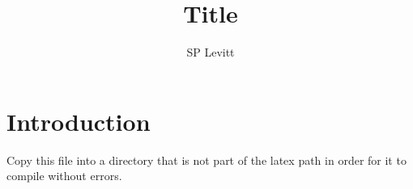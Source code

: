 \documentclass[a4paper,11pt]{article}
\title{Title}
\author{SP Levitt}
\begin{document}
\maketitle

\section{Introduction}
Copy this file into a directory that is not part of the latex path in order for it to compile without errors.
\end{document}
